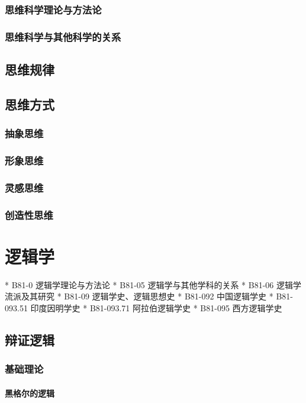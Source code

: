 \documentclass[UTF8]{../RepresentationUniverse}
\begin{document}
    \subsection{思维科学理论与方法论}
    \subsection{思维科学与其他科学的关系}
\section{思维规律}
\section{思维方式}
    \subsection{抽象思维}
    \subsection{形象思维}
    \subsection{灵感思维}
    \subsection{创造性思维}



\chapter{逻辑学}
* B81-0 逻辑学理论与方法论
* B81-05 逻辑学与其他学科的关系
* B81-06 逻辑学流派及其研究
* B81-09 逻辑学史、逻辑思想史
  * B81-092 中国逻辑学史
      * B81-093.51 印度因明学史
      * B81-093.71 阿拉伯逻辑学史
  * B81-095 西方逻辑学史


\section{辩证逻辑}
    \subsection{基础理论}
        \subsubsection{黑格尔的逻辑}
\end{document}
